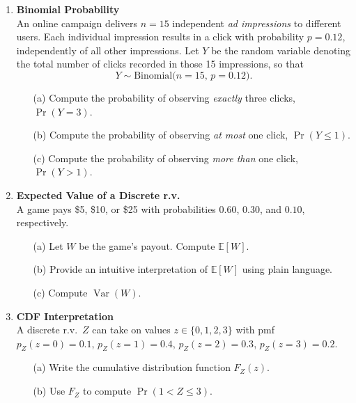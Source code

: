 \documentclass{article}
\begin{document}
\begin{enumerate}
    \item \textbf{Binomial Probability}  \\
          An online campaign delivers $n=15$ independent \emph{ad impressions} to different users.
          Each individual impression results in a click with probability $p = 0.12$, independently of all other impressions.
          Let $Y$ be the random variable denoting the total number of clicks recorded in those 15 impressions, so that
          \[
          Y \sim \text{Binomial}\!\bigl(n=15,\,p=0.12\bigr).
          \]
          \begin{enumerate}
            \item[(a)] Compute the probability of observing \emph{exactly} three clicks, $\Pr(Y = 3)$.
            \item[(b)] Compute the probability of observing \emph{at most} one click, $\Pr(Y \le 1)$.
            \item[(c)] Compute the probability of observing \emph{more than} one click, $\Pr(Y > 1)$.
          \end{enumerate}

    \item \textbf{Expected Value of a Discrete r.v.}  \\
          A game pays \$5, \$10, or \$25 with probabilities $0.60$, $0.30$, and $0.10$, respectively.
          \begin{enumerate}
              \item[(a)] Let $W$ be the game's payout.  Compute $\mathbb{E}[W]$.
              \item[(b)] Provide an intuitive interpretation of $\mathbb{E}[W]$ using plain language.
              \item[(c)] Compute $\operatorname{Var}(W)$.
          \end{enumerate}

    \item \textbf{CDF Interpretation}  \\
          A discrete r.v.\ $Z$  can take on values $z \in \{0,1,2,3\}$ with pmf $p_Z(z=0)=0.1$, $p_Z(z=1)=0.4$, $p_Z(z=2)=0.3$, $p_Z(z=3)=0.2$.
          \begin{enumerate}
              \item[(a)] Write the cumulative distribution function $F_Z(z)$.
              \item[(b)] Use $F_Z$ to compute $\Pr(1<Z\le 3)$.
          \end{enumerate}


\end{enumerate}
\end{document}
